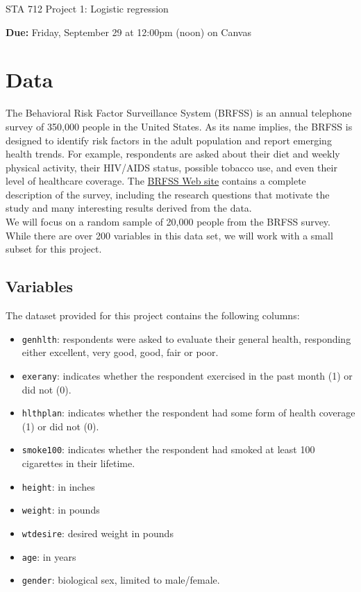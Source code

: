 \documentclass[11pt]{article}
\begin{document}
\begin{center}
\Large
STA 712 Project 1: Logistic regression\\
\normalsize
\vspace{5mm}
\end{center}

\noindent \textbf{Due:} Friday, September 29 at 12:00pm (noon) on Canvas

\section*{Data}

The Behavioral Risk Factor Surveillance System (BRFSS) is an annual telephone survey of 350,000 people in the United States. As its name implies, the BRFSS is designed to identify risk factors in the adult population and report emerging health trends. For example, respondents are asked about their diet and weekly physical activity, their HIV/AIDS status, possible tobacco use, and even their level of healthcare coverage. The \href{https://www.cdc.gov/brfss/}{BRFSS Web site} contains a complete description of the survey, including the research questions that motivate the study and many interesting results derived from the data.\\

\noindent We will focus on a random sample of 20,000 people from the BRFSS survey. While there are over 200 variables in this data set, we will work with a small subset for this project.

\subsection*{Variables}

The dataset provided for this project contains the following columns:

\begin{itemize}
\item \verb;genhlth;: respondents were asked to evaluate their general health, responding either excellent, very good, good, fair or poor.
\item \verb;exerany;: indicates whether the respondent exercised in the past month (1) or did not (0).
\item \verb;hlthplan;: indicates whether the respondent had some form of health coverage (1) or did not (0).
\item \verb;smoke100;: indicates whether the respondent had smoked at least 100 cigarettes in their lifetime.
\item \verb;height;: in inches
\item \verb;weight;: in pounds
\item \verb;wtdesire;: desired weight in pounds
\item \verb;age;: in years
\item \verb;gender;: biological sex, limited to male/female.
\end{itemize}
\end{document}
